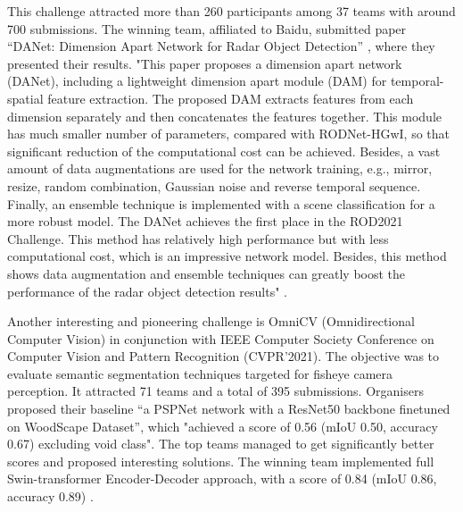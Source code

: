 \documentclass[twoside,11pt]{article}
\begin{document}
This challenge attracted more than 260 participants among 37 teams with around 700 submissions. The winning team, affiliated to Baidu, submitted paper “DANet: Dimension Apart Network for Radar Object Detection” \citep{DANet}, where they presented their results. "This paper proposes a dimension apart network (DANet), including a lightweight dimension apart module (DAM) for temporal-spatial feature extraction. The proposed DAM extracts features from each dimension separately and then concatenates the features together. This module has much smaller number of parameters, compared with RODNet-HGwI, so that significant reduction of the computational cost can be achieved. Besides, a vast amount of data augmentations are used for the network training, e.g., mirror, resize, random combination, Gaussian noise and reverse temporal sequence. Finally, an ensemble technique is implemented with a scene classification for a more robust model. The DANet achieves the first place in the ROD2021 Challenge. This method has relatively high performance but with less computational cost, which is an impressive network model. Besides, this method shows data augmentation and ensemble techniques can greatly boost the performance of the radar object detection results" \citep{wang2021rod2021}.
 
Another interesting and pioneering challenge is OmniCV (Omnidirectional Computer Vision) in conjunction with IEEE Computer Society Conference on Computer Vision and Pattern Recognition (CVPR'2021). The objective was to evaluate semantic segmentation techniques targeted for fisheye camera perception. It attracted 71 teams and a total of 395 submissions. Organisers proposed their baseline “a PSPNet network with a ResNet50 backbone finetuned on WoodScape Dataset”, which "achieved a score of 0.56 (mIoU 0.50, accuracy 0.67) excluding void class". The top teams managed to get significantly better scores and proposed interesting solutions. The winning team implemented full Swin-transformer Encoder-Decoder approach, with a score of 0.84 (mIoU 0.86, accuracy 0.89) \citep{Fisheye_AD}.





\end{document}
